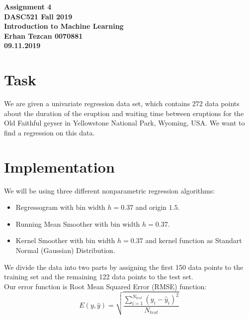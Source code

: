 \documentclass[11pt,reqno]{amsart}
\begin{document}
\begin{center}
\large\textbf{Assignment 4 \\ DASC521 Fall 2019} \\
\normalsize\textbf{Introduction to Machine Learning \\  Erhan Tezcan 0070881 \\ 09.11.2019} \\
\end{center}

\section{Task}
We are given a univariate regression data set, which contains 272 data points about the duration of the eruption and waiting time between eruptions for the Old Faithful geyser in Yellowstone National Park, Wyoming, USA. We want to find a regression on this data.

\section{Implementation}
We will be using three different nonparametric regression algorithms: 
\begin{itemize}
	\item Regressogram with bin width $h=0.37$ and origin $1.5$.
	\item Running Mean Smoother with bin width $h=0.37$.
	\item Kernel Smoother with bin width $h=0.37$ and kernel function as Standart Normal (Gaussian) Distribution.
\end{itemize}
We divide the data into two parts by assigning the first 150 data points to the training set
and the remaining 122 data points to the test set. \\

Our error function is Root Mean Squared Error (RMSE) function:
\begin{equation}
E(y,\hat{y}) = \sqrt{\frac{\sum_{i=1}^{N_{test}}(y_i-\hat{y}_i)^2}{N_{test}}}
\end{equation}
\end{document}
